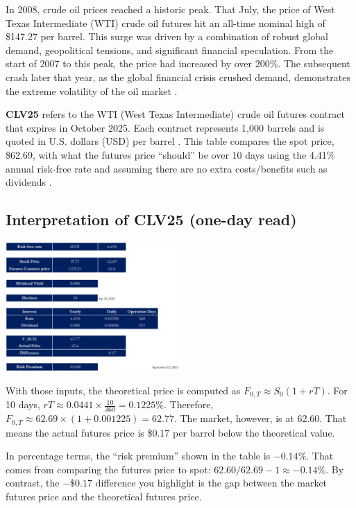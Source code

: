 \documentclass[11pt,a4paper]{article} %
\begin{document}
In 2008, crude oil prices reached a historic peak. That July, the price of West Texas Intermediate (WTI) crude oil futures hit an all-time nominal high of \$147.27 per barrel. This surge was driven by a combination of robust global demand, geopolitical tensions, and significant financial speculation. From the start of 2007 to this peak, the price had increased by over 200\%. The subsequent crash later that year, as the global financial crisis crushed demand, demonstrates the extreme volatility of the oil market \citep{reuters_oil_peak_2008,worldbank_oil_spike_2008}.

\textbf{CLV25} refers to the WTI (West Texas Intermediate) crude oil futures contract that expires in October 2025. Each contract represents 1{,}000 barrels and is quoted in U.S. dollars (USD) per barrel \citep{cme_cl_specs,cme_cl_calendar}.
This table compares the spot price, \$62.69, with what the futures price “should” be over 10 days using the 4.41\% annual risk-free rate and assuming there are no extra costs/benefits such as dividends \citep{frbny_sofr}.


\subsection{Interpretation of \texorpdfstring{CLV25}{CLV25} (one-day read)}
\begin{center}
\includegraphics[width=0.5\textwidth]{figures/wti.png}
\end{center}

With those inputs, the theoretical price is computed as $F_{0,T} \approx S_0(1 + rT)$. For 10 days, $rT \approx 0.0441 \times \frac{10}{360} = 0.1225\%$. Therefore, $F_{0,T} \approx 62.69 \times (1 + 0.001225) = 62.77$. The market, however, is at 62.60. That means the actual futures price is \$0.17 per barrel below the theoretical value.

In percentage terms, the “risk premium” shown in the table is $-0.14\%$. That comes from comparing the futures price to spot: $62.60/62.69 - 1 \approx -0.14\%$. By contrast, the $-\$0.17$ difference you highlight is the gap between the market futures price and the theoretical futures price.
\end{document}
